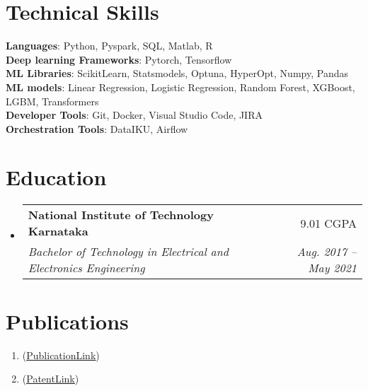 \documentclass[letterpaper,11pt]{article}
\makeatletter
\newcommand{\resumeSubheading}[4]{
  \vspace{-4pt}\item
    \begin{tabular*}{0.97\textwidth}[t]{l@{\extracolsep{\fill}}r}
      \textbf{#1} & #2 \\
      \textit{\small#3} & \textit{\small #4} \\
    \end{tabular*}\vspace{-10pt}
}
\newcommand{\resumeSubHeadingListStart}{\begin{itemize}[leftmargin=0.1in, label={}]}
\newcommand{\resumeSubHeadingListEnd}{\end{itemize}}
\makeatother
\begin{document}
\section{Technical Skills}
 \begin{itemize}[leftmargin=0.15in, label={}]
    \small{\item{
     \textbf{Languages}{: Python, Pyspark, SQL, Matlab, R} \\
     \textbf{Deep learning Frameworks}{: Pytorch, Tensorflow} \\
     \textbf{ML Libraries}{: ScikitLearn, Statsmodels, Optuna, HyperOpt, Numpy, Pandas} \\
     \textbf{ML models}{: Linear Regression, Logistic Regression, Random Forest, XGBoost, LGBM, Transformers} \\
     \textbf{Developer Tools}{: Git, Docker, Visual Studio Code, JIRA} \\
     \textbf{Orchestration Tools}{: DataIKU, Airflow} \\
      
    }}
 \end{itemize}

\section{Education}
  \resumeSubHeadingListStart
    \resumeSubheading
      {National Institute of Technology Karnataka}{9.01 CGPA}
      {Bachelor of Technology in Electrical and Electronics Engineering}{Aug. 2017 -- May 2021}
  \resumeSubHeadingListEnd

 

\section*{Publications}
  \begin{enumerate}
    \item {}
    (\href{https://ieeexplore.ieee.org/document/9597799}{\underline{PublicationLink}})

  \item {}
  (\href{https://www.nitk.ac.in/patent-granted-to-dr-tukaram-moger-team}{\underline{PatentLink}})
  \end{enumerate}

\end{document}
